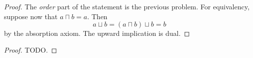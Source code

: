 \begin{proof}
The \emph{order} part of the statement is the previous problem. For equivalency, suppose now that \( a \sqcap b = a \). Then
\[ 
    a \sqcup b = (a \sqcap b) \sqcup b = b 
\]
by the absorption axiom. The upward implication is dual.
\end{proof}


\begin{proof}
TODO.
\end{proof}
